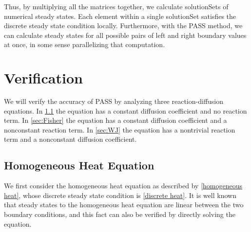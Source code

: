 \documentclass[11pt]{article}
\begin{document}
Thus, by multiplying all the matrices together, we calculate solutionSets of numerical steady states. Each element within a single solutionSet satisfies the discrete steady state condition locally. Furthermore, with the PASS method, we can calculate steady states for all possible pairs of left and right boundary values at once, in some sense parallelizing that computation.

\section{Verification}\label{sec:verification}

We will verify the accuracy of PASS by analyzing three reaction-diffusion equations. In \cref{sec:homog_heat} the equation has a constant diffusion coefficient and no reaction term. In \cref{sec:Fisher} the equation has a constant diffusion coefficient and a nonconstant reaction term. In \cref{sec:WJ} the equation has a nontrivial reaction term and a nonconstant diffusion coefficient.

\subsection{Homogeneous Heat Equation}\label{sec:homog_heat}

We first consider the homogeneous heat equation as described by \cref{homogeneous heat}, whose discrete steady state condition is \cref{discrete heat}. It is well known that steady states to the homogeneous heat equation are linear between the two boundary conditions, and this fact can also be verified by directly solving the equation.
\end{document}
